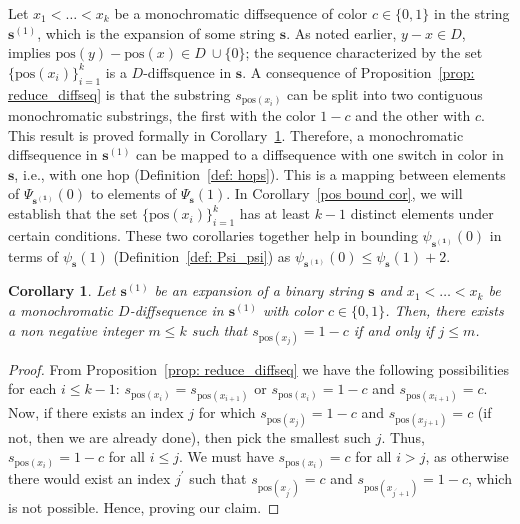 \documentclass[11pt]{article}
\newtheorem{cor}{Corollary}
\begin{document}
Let $x_1<\dots<x_k$ be a monochromatic diffsequence of color $c \in \{0,1\}$ in the string $\mathbf{s}^{(1)}$, which is the expansion of some string $\mathbf{s}$. As noted earlier, $y-x \in D$, implies $\text{pos}(y)-\text{pos}(x) \in D \ \cup \{0\}$; the sequence characterized by the set $\{\text{pos}(x_i)\}_{i=1}^{k}$ is a $D$-diffsquence in $\mathbf{s}$. A consequence of Proposition~\ref{prop: reduce_diffseq} is that the substring $s_{\text{pos}(x_i)}$ can be split into two contiguous monochromatic substrings, the first with the color $1-c$ and the other with $c$. This result is proved formally in Corollary~\ref{A B split cor}. Therefore, a monochromatic diffsequence in $\mathbf{s}^{(1)}$ can be mapped to a diffsequence with one switch in color in $\mathbf{s}$, i.e., with one hop (Definition~\ref{def: hops}). This is a mapping between elements of $\Psi_{\mathbf{s^{(1)}}}(0)$ to elements of $\Psi_{\mathbf{s}}(1)$. In Corollary~\ref{pos bound cor}, we will establish that the set $\{\text{pos}(x_i)\}_{i=1}^{k}$ has at least $k-1$ distinct elements under certain conditions. These two corollaries together help in bounding $\psi_{\mathbf{s^{(1)}}}(0)$ in terms of $\psi_{\mathbf{s}}(1)$ (Definition~\ref{def: Psi_psi}) as $\psi_{\mathbf{s^{(1)}}}(0) \le \psi_{\mathbf{s}}(1) +2$.

\begin{cor}\label{A B split cor}
    Let $\mathbf{s}^{(1)}$ be an expansion of a binary string $\mathbf{s}$ and $x_1<\dots<x_k$ be a monochromatic $D$-diffsequence in $\mathbf{s}^{(1)}$ with color $c \in \{0,1\}$. Then, there exists a non negative integer $m\le k$ such that $s_{\text{pos}(x_j)}=1-c$ if and only if $j\le m$.
\end{cor}
\begin{proof}
    From Proposition~\ref{prop: reduce_diffseq} we have the following possibilities for each $i\le k-1$: $s_{\text{pos}(x_i)}=s_{\text{pos}(x_{i+1})}$ or $s_{\text{pos}(x_i)}=1-c$ and $s_{\text{pos}(x_{i+1})}=c$. Now, if there exists an index $j$ for which $s_{\text{pos}(x_j)}=1-c$ and $s_{\text{pos}(x_{j+1})}=c$ (if not, then we are already done), then pick the smallest such $j$. Thus, $s_{\text{pos}(x_i)}=1-c$ for all $i\le j$. We must have $s_{\text{pos}(x_i)}=c$ for all $i>j$, as otherwise there would exist an index $j^{\prime}$ such that $s_{\text{pos}(x_{j^{\prime}})}=c$ and $s_{\text{pos}(x_{j^{\prime}+1})}=1-c$, which is not possible. Hence, proving our claim.
\end{proof}
\end{document}
